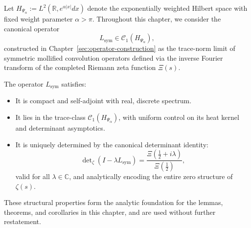 \begin{remark}
\label{rem:setup-operator-framework}
Let \( H_{\Psi_\alpha} := L^2(\mathbb{R}, e^{\alpha|x|} dx) \) denote the exponentially weighted Hilbert space with fixed weight parameter \( \alpha > \pi \). Throughout this chapter, we consider the canonical operator
\[
L_{\mathrm{sym}} \in \mathcal{C}_1(H_{\Psi_\alpha}),
\]
constructed in Chapter~\ref{sec:operator-construction} as the trace-norm limit of symmetric mollified convolution operators defined via the inverse Fourier transform of the completed Riemann zeta function \( \Xi(s) \).

The operator \( L_{\mathrm{sym}} \) satisfies:
\begin{itemize}
  \item It is compact and self-adjoint with real, discrete spectrum.
  \item It lies in the trace-class \( \mathcal{C}_1(H_{\Psi_\alpha}) \), with uniform control on its heat kernel and determinant asymptotics.
  \item It is uniquely determined by the canonical determinant identity:
  \[
  \det\nolimits_{\zeta}(I - \lambda L_{\mathrm{sym}}) = \frac{\Xi\left( \tfrac{1}{2} + i\lambda \right)}{\Xi\left( \tfrac{1}{2} \right)},
  \]
  valid for all \( \lambda \in \mathbb{C} \), and analytically encoding the entire zero structure of \( \zeta(s) \).
\end{itemize}

These structural properties form the analytic foundation for the lemmas, theorems, and corollaries in this chapter, and are used without further restatement.
\end{remark}
